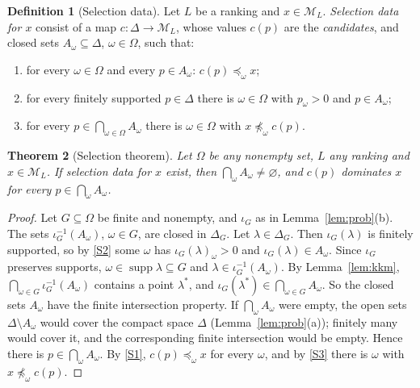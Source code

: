 \documentclass[11pt]{article}
\newtheorem{theorem}{Theorem}[section]
\theoremstyle{definition}
\newtheorem{definition}[theorem]{Definition}
\theoremstyle{remark}
\newcommand{\M}{\mathcal M}
\newcommand{\supp}{\operatorname{supp}}
\begin{document}
\begin{definition}[Selection data]\label{def:selection-data}
Let $L$ be a ranking and $x\in\M_L$. \emph{Selection data for $x$} consist of a map $c:\Delta\to\M_L$, whose values $c(p)$ are the \emph{candidates}, and closed sets $A_\omega\subseteq\Delta$, $\omega\in\Omega$, such that:
\begin{enumerate}[label=(S\arabic*),leftmargin=3em]
\item\label{S1} for every $\omega\in\Omega$ and every $p\in A_\omega$: $c(p)\preceq_\omega x$;
\item\label{S2} for every finitely supported $p\in\Delta$ there is $\omega\in\Omega$ with $p_\omega>0$ and $p\in A_\omega$;
\item\label{S3} for every $p\in\bigcap_{\omega\in\Omega}A_\omega$ there is $\omega\in\Omega$ with $x\not\preceq_\omega c(p)$.
\end{enumerate}
\end{definition}

\begin{theorem}[Selection theorem]\label{thm:selection}
Let $\Omega$ be any nonempty set, $L$ any ranking and $x\in\M_L$. If selection data for $x$ exist, then $\bigcap_\omega A_\omega\ne\varnothing$, and $c(p)$ dominates $x$ for every $p\in\bigcap_\omega A_\omega$.
\end{theorem}
\begin{proof}
Let $G\subseteq\Omega$ be finite and nonempty, and $\iota_G$ as in Lemma~\ref{lem:prob}(b). The sets $\iota_G^{-1}(A_\omega)$, $\omega\in G$, are closed in $\Delta_G$. Let $\lambda\in\Delta_G$. Then $\iota_G(\lambda)$ is finitely supported, so by \ref{S2} some $\omega$ has $\iota_G(\lambda)_\omega>0$ and $\iota_G(\lambda)\in A_\omega$. Since $\iota_G$ preserves supports, $\omega\in\supp\lambda\subseteq G$ and $\lambda\in\iota_G^{-1}(A_\omega)$. By Lemma~\ref{lem:kkm}, $\bigcap_{\omega\in G}\iota_G^{-1}(A_\omega)$ contains a point $\lambda^*$, and $\iota_G(\lambda^*)\in\bigcap_{\omega\in G}A_\omega$. So the closed sets $A_\omega$ have the finite intersection property. If $\bigcap_\omega A_\omega$ were empty, the open sets $\Delta\setminus A_\omega$ would cover the compact space $\Delta$ (Lemma~\ref{lem:prob}(a)); finitely many would cover it, and the corresponding finite intersection would be empty. Hence there is $p\in\bigcap_\omega A_\omega$. By \ref{S1}, $c(p)\preceq_\omega x$ for every $\omega$, and by \ref{S3} there is $\omega$ with $x\not\preceq_\omega c(p)$.
\end{proof}
\end{document}
